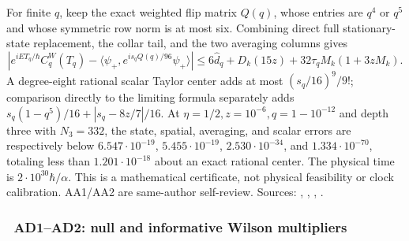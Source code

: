 For finite $q$, keep the exact weighted flip matrix $Q(q)$, whose entries are
$q^4$ or $q^5$ and whose symmetric row norm is at most six.  Combining direct
full stationary-state replacement, the collar tail, and the two averaging
columns gives
\begin{equation}
 \left|e^{iET_q/\hbar}C_q^W(T_q)
 -\langle\psi_+,e^{is_qQ(q)/96}\psi_+\rangle\right|
 \le6\widehat d_q+D_k(15z)+32\tau_qM_k(1+3zM_k).
 \label{recent:aa-finite-q}
\end{equation}
A degree-eight rational scalar Taylor center adds at most
$(s_q/16)^9/9!$; comparison directly to the limiting formula separately adds
$s_q(1-q^5)/16+|s_q-8z/7|/16$.
At $\eta=1/2,z=10^{-6},q=1-10^{-12}$ and depth three with $N_3=332$, the state,
spatial, averaging, and scalar errors are respectively below
$6.547\cdot10^{-19}$, $5.455\cdot10^{-19}$, $2.530\cdot10^{-34}$, and
$1.334\cdot10^{-70}$, totaling less than $1.201\cdot10^{-18}$ about an exact
rational center.  The physical time is $2\cdot10^{30}\hbar/\alpha$.
This is a mathematical certificate, not physical feasibility or clock
calibration.  AA1/AA2 are same-author self-review.
Sources: ,
,
,
.

\subsubsection{\workstar\ AD1--AD2: null and informative Wilson multipliers}

